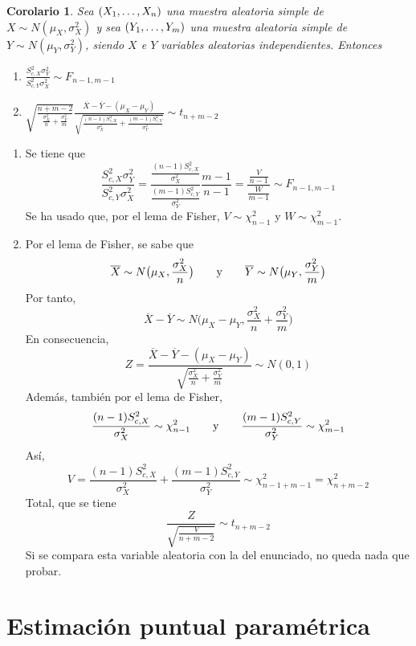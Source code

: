 \documentclass[11pt]{report}
\makeatletter
\renewenvironment{proof}[1][\proofname]{\par
  \pushQED{\qed}%
  \normalfont \topsep\z@skip %
  \trivlist
  \item[\hskip\labelsep
        \itshape
    #1\@addpunct{.}]\ignorespaces
}{%
  \popQED\endtrivlist\@endpefalse
}
\newtheorem{corollary}{Corolario} %
\theoremstyle{definition}
\makeatother
\begin{document}
\begin{corollary}
\label{cor8}
Sea $(X_1,\mathellipsis,X_n)$ una muestra aleatoria simple de $X \sim N(\mu_X,\sigma_X^2)$ y sea $(Y_1,\mathellipsis,Y_m)$ una muestra aleatoria simple de $Y \sim N(\mu_Y,\sigma_Y^2)$, siendo $X$ e $Y$ variables aleatorias independientes. Entonces
\begin{enumerate}
    \item $\displaystyle \frac{S_{c,X}^2\sigma^2_Y}{S^2_{c,Y}\sigma^2_X} \sim F_{n-1,m-1}$
    \item $\displaystyle \sqrt{\frac{n+m-2}{\frac{\sigma^2_X}{n}+\frac{\sigma^2_Y}{m}}}\frac{\overline{X}-\overline{Y}-(\mu_X-\mu_Y)}{\sqrt{\frac{(n-1)S_{c,X}^2}{\sigma^2_X}+\frac{(m-1)S_{c,Y}^2}{\sigma^2_Y}}} \sim t_{n+m-2}$
\end{enumerate}
\end{corollary}

\begin{proof}
\hfill
\begin{enumerate}
    \item Se tiene que
    \[\frac{S^2_{c,X}\sigma^2_Y}{S^2_{c,Y}\sigma^2_X} = \frac{\frac{(n-1)S^2_{c,X}}{\sigma^2_X}}{\frac{(m-1)S^2_{c,Y}}{\sigma^2_Y}}\frac{m-1}{n-1} = \frac{\frac{V}{n-1}}{\frac{W}{m-1}} \sim F_{n-1,m-1}\]
    Se ha usado que, por el lema de Fisher, $V \sim \chi^2_{n-1}$ y $W \sim \chi^2_{m-1}$.
    \item Por el lema de Fisher, se sabe que
    \[\overline{X} \sim N\bigl(\mu_X,\frac{\sigma^2_X}{n}\bigr) \qquad \textup{y} \qquad \overline{Y} \sim N\bigl(\mu_Y,\frac{\sigma^2_Y}{m}\bigr)\]
    Por tanto,
    \[\overline{X}-\overline{Y} \sim N\bigl(\mu_X-\mu_Y,\frac{\sigma^2_X}{n}+\frac{\sigma^2_Y}{m}\bigr)\]
    En consecuencia,
    \[Z=\frac{\overline{X}-\overline{Y}-(\mu_X-\mu_Y)}{\sqrt{\frac{\sigma^2_X}{n}+\frac{\sigma^2_Y}{m}}} \sim N(0,1)\]
    Además, también por el lema de Fisher,
    \[\frac{(n-1)S^2_{c,X}}{\sigma^2_X} \sim \chi^2_{n-1} \qquad \textup{y} \qquad \frac{(m-1)S^2_{c,Y}}{\sigma^2_Y} \sim \chi^2_{m-1}\]
    Así,
    \[V= \frac{(n-1)S^2_{c,X}}{\sigma^2_X}+\frac{(m-1)S^2_{c,Y}}{\sigma^2_Y} \sim \chi^2_{n-1+m-1} = \chi^2_{n+m-2}\]
    Total, que se tiene
    \[\frac{Z}{\sqrt{\frac{V}{n+m-2}}} \sim t_{n+m-2}\]
    Si se compara esta variable aleatoria con la del enunciado, no queda nada que probar. \qedhere
\end{enumerate}
\end{proof}

\chapter{Estimación puntual paramétrica}
\end{document}
